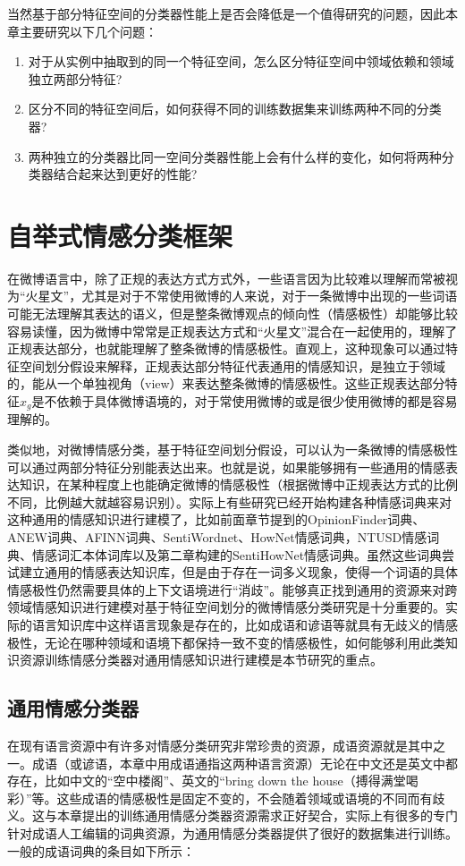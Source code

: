 当然基于部分特征空间的分类器性能上是否会降低是一个值得研究的问题，因此本章主要研究以下几个问题：
\begin{enumerate}
\item 对于从实例中抽取到的同一个特征空间，怎么区分特征空间中领域依赖和领域独立两部分特征?
\item 区分不同的特征空间后，如何获得不同的训练数据集来训练两种不同的分类器?
\item 两种独立的分类器比同一空间分类器性能上会有什么样的变化，如何将两种分类器结合起来达到更好的性能?
\end{enumerate}

\section{自举式情感分类框架}
\label{ch4_frame}
在微博语言中，除了正规的表达方式方式外，一些语言因为比较难以理解而常被视为“火星文”，尤其是对于不常使用微博的人来说，对于一条微博中出现的一些词语可能无法理解其表达的语义，但是整条微博观点的倾向性（情感极性）却能够比较容易读懂，因为微博中常常是正规表达方式和“火星文”混合在一起使用的，理解了正规表达部分，也就能理解了整条微博的情感极性。直观上，这种现象可以通过特征空间划分假设来解释，正规表达部分特征代表通用的情感知识，是独立于领域的，能从一个单独视角（view）来表达整条微博的情感极性。这些正规表达部分特征$ x_{g} $是不依赖于具体微博语境的，对于常使用微博的或是很少使用微博的都是容易理解的。

类似地，对微博情感分类，基于特征空间划分假设，可以认为一条微博的情感极性可以通过两部分特征分别能表达出来。也就是说，如果能够拥有一些通用的情感表达知识，在某种程度上也能确定微博的情感极性（根据微博中正规表达方式的比例不同，比例越大就越容易识别）。实际上有些研究已经开始构建各种情感词典来对这种通用的情感知识进行建模了，比如前面章节提到的OpinionFinder词典、ANEW词典、AFINN词典、SentiWordnet、HowNet情感词典，NTUSD情感词典、情感词汇本体词库以及第二章构建的SentiHowNet情感词典。虽然这些词典尝试建立通用的情感表达知识库，但是由于存在一词多义现象，使得一个词语的具体情感极性仍然需要具体的上下文语境进行“消歧”。能够真正找到通用的资源来对跨领域情感知识进行建模对基于特征空间划分的微博情感分类研究是十分重要的。实际的语言知识库中这样语言现象是存在的，比如成语和谚语等就具有无歧义的情感极性，无论在哪种领域和语境下都保持一致不变的情感极性，如何能够利用此类知识资源训练情感分类器对通用情感知识进行建模是本节研究的重点。

\subsection{通用情感分类器}
\label{general}
在现有语言资源中有许多对情感分类研究非常珍贵的资源，成语资源就是其中之一。成语（或谚语，本章中用成语通指这两种语言资源）无论在中文还是英文中都存在，比如中文的“空中楼阁”、英文的“bring down the house（搏得满堂喝彩）”等。这些成语的情感极性是固定不变的，不会随着领域或语境的不同而有歧义。这与本章提出的训练通用情感分类器资源需求正好契合，实际上有很多的专门针对成语人工编辑的词典资源，为通用情感分类器提供了很好的数据集进行训练。一般的成语词典的条目如下所示：

